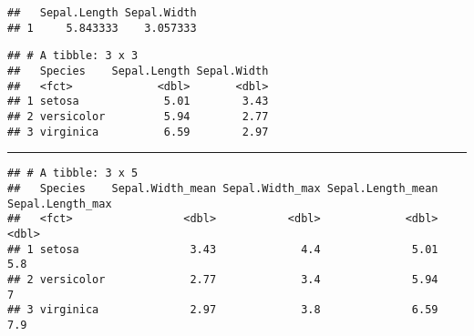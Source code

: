 \documentclass[]{article}
\newenvironment{Shaded}{\begin{snugshade}}{\end{snugshade}}
\newcommand{\CommentTok}[1]{\textcolor[rgb]{0.56,0.35,0.01}{\textit{#1}}}
\newcommand{\DataTypeTok}[1]{\textcolor[rgb]{0.13,0.29,0.53}{#1}}
\newcommand{\KeywordTok}[1]{\textcolor[rgb]{0.13,0.29,0.53}{\textbf{#1}}}
\newcommand{\NormalTok}[1]{#1}
\newcommand{\OperatorTok}[1]{\textcolor[rgb]{0.81,0.36,0.00}{\textbf{#1}}}
\newcommand{\StringTok}[1]{\textcolor[rgb]{0.31,0.60,0.02}{#1}}
\begin{document}
\begin{verbatim}
##   Sepal.Length Sepal.Width
## 1     5.843333    3.057333
\end{verbatim}

\begin{Shaded}
\end{Shaded}

\begin{verbatim}
## # A tibble: 3 x 3
##   Species    Sepal.Length Sepal.Width
##   <fct>             <dbl>       <dbl>
## 1 setosa             5.01        3.43
## 2 versicolor         5.94        2.77
## 3 virginica          6.59        2.97
\end{verbatim}

\begin{center}\rule{0.5\linewidth}{0.5pt}\end{center}

\begin{Shaded}
\end{Shaded}

\begin{verbatim}
## # A tibble: 3 x 5
##   Species    Sepal.Width_mean Sepal.Width_max Sepal.Length_mean Sepal.Length_max
##   <fct>                 <dbl>           <dbl>             <dbl>            <dbl>
## 1 setosa                 3.43             4.4              5.01              5.8
## 2 versicolor             2.77             3.4              5.94              7  
## 3 virginica              2.97             3.8              6.59              7.9
\end{verbatim}
\end{document}
